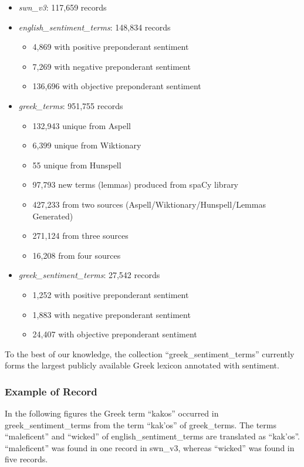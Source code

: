 \begin{itemize}
 \item \emph{swn\_v3}: 117,659 records
 \item \emph{english\_sentiment\_terms}: 148,834 records
 \begin{itemize}
  \item 4,869 with positive preponderant sentiment
  \item 7,269 with negative preponderant sentiment
  \item 136,696 with objective preponderant sentiment
 \end{itemize}
 \item \emph{greek\_terms}: 951,755 records
 \begin{itemize}
  \item 132,943 unique from Aspell
  \item 6,399 unique from Wiktionary
  \item 55 unique from Hunspell
  \item 97,793 new terms (lemmas) produced from spaCy library
  \item 427,233 from two sources (Aspell/Wiktionary/Hunspell/Lemmas Generated)
  \item 271,124 from three sources
  \item 16,208 from four sources
 \end{itemize}
 \item \emph{greek\_sentiment\_terms}: 27,542 records
 \begin{itemize}
  \item 1,252 with positive preponderant sentiment
  \item 1,883 with negative preponderant sentiment
  \item 24,407 with objective preponderant sentiment
 \end{itemize} 
\end{itemize}

To the best of our knowledge,
the collection ``greek\_sentiment\_terms'' currently forms
the largest publicly available Greek lexicon annotated with sentiment.

\subsubsection{Example of Record}
\label{subsubsec:recexample}

In the following figures
the Greek term ``\textgreek{kakos}'' occurred in greek\_sentiment\_terms
from the term ``\textgreek{kak'os}'' of greek\_terms.
The terms ``maleficent'' and ``wicked'' of english\_sentiment\_terms
are translated as ``\textgreek{kak'os}''.
``maleficent'' was found in one record in swn\_v3,
whereas ``wicked'' was found in five records. \\

